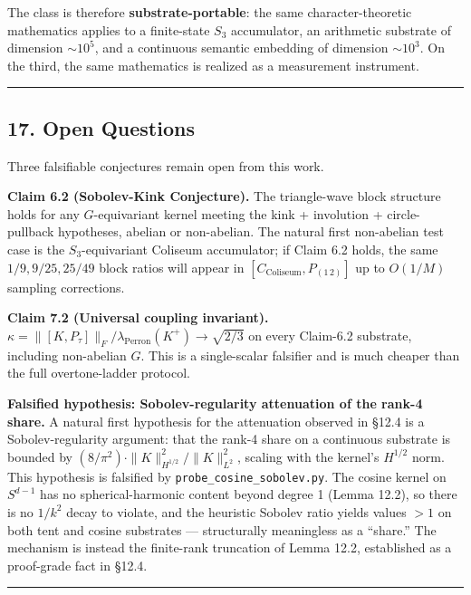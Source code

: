 \documentclass[
  11pt,
]{article}
\begin{document}
The class is therefore \textbf{substrate-portable}: the same
character-theoretic mathematics applies to a finite-state \(S_3\)
accumulator, an arithmetic substrate of dimension \(\sim 10^5\), and a
continuous semantic embedding of dimension \(\sim 10^3\). On the third,
the same mathematics is realized as a measurement instrument.

\begin{center}\rule{0.5\linewidth}{0.5pt}\end{center}

\subsection{17. Open Questions}\label{open-questions}

Three falsifiable conjectures remain open from this work.

\textbf{Claim 6.2 (Sobolev-Kink Conjecture).} The triangle-wave block
structure holds for any \(G\)-equivariant kernel meeting the kink +
involution + circle-pullback hypotheses, abelian or non-abelian. The
natural first non-abelian test case is the \(S_3\)-equivariant Coliseum
accumulator; if Claim 6.2 holds, the same \(1/9, 9/25, 25/49\) block
ratios will appear in \([C_\text{Coliseum}, P_{(1\,2)}]\) up to
\(O(1/M)\) sampling corrections.

\textbf{Claim 7.2 (Universal coupling invariant).}
\(\kappa = \|[K, P_\tau]\|_F / \lambda_\text{Perron}(K^+) \to \sqrt{2/3}\)
on every Claim-6.2 substrate, including non-abelian \(G\). This is a
single-scalar falsifier and is much cheaper than the full
overtone-ladder protocol.

\textbf{Falsified hypothesis: Sobolev-regularity attenuation of the
rank-4 share.} A natural first hypothesis for the attenuation observed
in §12.4 is a Sobolev-regularity argument: that the rank-4 share on a
continuous substrate is bounded by
\((8/\pi^2) \cdot \|K\|_{H^{1/2}}^2 / \|K\|_{L^2}^2\), scaling with the
kernel's \(H^{1/2}\) norm. This hypothesis is falsified by
\texttt{probe\_cosine\_sobolev.py}. The cosine kernel on \(S^{d-1}\) has
no spherical-harmonic content beyond degree 1 (Lemma 12.2), so there is
no \(1/k^2\) decay to violate, and the heuristic Sobolev ratio yields
values \(> 1\) on both tent and cosine substrates --- structurally
meaningless as a ``share.'' The mechanism is instead the finite-rank
truncation of Lemma 12.2, established as a proof-grade fact in §12.4.

\begin{center}\rule{0.5\linewidth}{0.5pt}\end{center}
\end{document}
